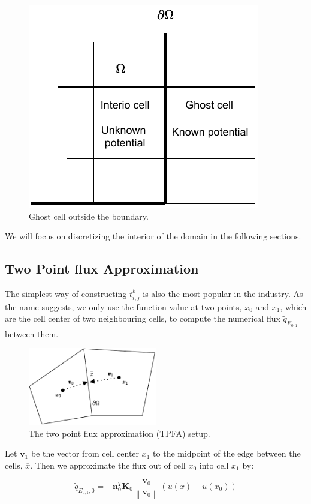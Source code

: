 \documentclass[../Main/main.tex]{subfiles}
\begin{document}
	\begin{figure}[H]
		\centering
		\includegraphics{ghostcell.pdf}
		\caption{Ghost cell outside the boundary.}
		\label{fig:ghost_cell}
	\end{figure}
	 We will focus on discretizing the interior of the domain in the following sections.
	\subsection{Two Point flux Approximation}
	The simplest way of constructing $t_{i,j}^k$ is also the most popular in the industry. As the name suggests, we only use the function value at two points, $x_{0}$ and $x_{1}$, which are the cell center of two neighbouring cells, to compute the numerical flux $\tilde{q}_{E_{0,1}}$ between them.
	\begin{figure}[H]
		\centering
		\includegraphics[width=0.5\textwidth]{two point.pdf}
		\caption{The two point flux approximation (TPFA) setup.}
		\label{fig:tpfa control volume}
	\end{figure}
	Let $\bm{v}_1$ be the vector from cell center $x_1$ to the midpoint of the edge between the cells, $\overline{x}$. Then we approximate the flux out of cell $x_0$ into cell $x_1$ by:
	
	\begin{equation}\label{eq:f_0}
		\tilde{q}_{E_{0,1},0}=-\bm{n}_0^T \bm{K}_0  \frac{\bm{v}_0}{\left \| \bm{v}_0 \right \|} (u(\overline{x})-u(x_0))
	\end{equation}
	
\end{document}
